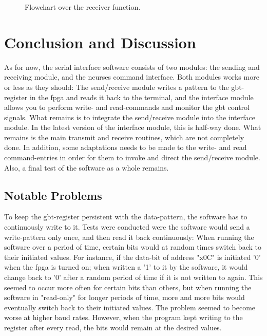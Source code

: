 \documentclass[main.tex]{subfiles}
\begin{document}
\begin{figure}[H] %
\begin{center}

\caption{Flowchart over the receiver function.}
\label{fig:flowrx}
\end{center}
\end{figure}


\section{Conclusion and Discussion}

As for now, the serial interface software consists of two modules: the sending and receiving module, and the ncurses command interface. Both modules works more or less as they should: The send/receive module writes a pattern to the \gls{gbt}-register in the \gls{fpga} and reads it back to the terminal, and the interface module allows you to perform write- and read-commands and monitor the \gls{gbt} control signals. What remains is to integrate the send/receive module into the interface module. In the latest version of the interface module, this is half-way done. What remains is the main transmit and receive routines, which are not completely done. In addition, some adaptations needs to be made to the write- and read command-entries in order for them to invoke and direct the send/receive module. Also, a final test of the software as a whole remains.

\subsection{Notable Problems}

To keep the \gls{gbt}-register persistent with the data-pattern, the software has to continuously write to it. Tests were conducted were the software would send a write-pattern only once, and then read it back continuously: When running the software over a period of time, certain bits would at random times switch back to their initiated values. For instance, if the data-bit of address "x0C" is initiated '0' when the \gls{fpga} is turned on; when written a '1' to it by the software, it would change back to '0' after a random period of time if it is not written to again. This seemed to occur more often for certain bits than others, but when running the software in "read-only" for longer periods of time, more and more bits would eventually switch back to their initiated values. The problem seemed to become worse at higher baud rates. However, when the program kept writing to the register after every read, the bits would remain at the desired values.\\
\end{document}
